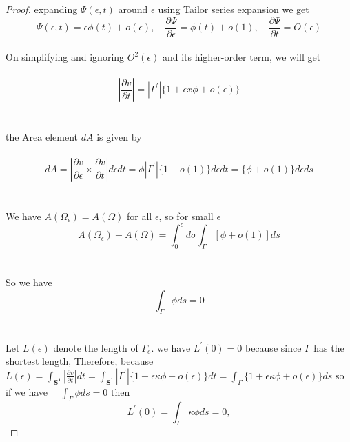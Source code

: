 \documentclass[oneside]{book}
\begin{document}
\begin{proof}
expanding $\Psi(\epsilon, t)$ around $\epsilon$ using Tailor series expansion we get \\

$$
\Psi(\epsilon, t)=\epsilon \phi(t)+o(\epsilon), \quad \frac{\partial \Psi}{\partial \epsilon}=\phi(t)+o(1), \quad \frac{\partial \Psi}{\partial t}=O(\epsilon)
$$ \\
On simplifying and ignoring $O^2(\epsilon)$ and its higher-order term, we will get \\\\
$$
\left|\frac{\partial v}{\partial t}\right|=\left|\Gamma^{\prime}\right|\{1+\epsilon x \phi+o(\epsilon)\}
$$ 
\\\\
 the Area element $d A$  is given by
 \\\\
     \begin{equation}
d A=\left|\frac{\partial v}{\partial \epsilon} \times \frac{\partial v}{\partial t}\right| d \epsilon d t=\phi\left|\Gamma^{\prime}\right|\{1+o(1)\} d \epsilon d t=\{\phi+o(1)\} d \epsilon d s
    \end{equation} \\\\
We have $A\left(\Omega_{\epsilon}\right)=A(\Omega)$ for all $\epsilon$, so for small $\epsilon$ \\

 $$
A\left(\Omega_{\epsilon}\right)-A(\Omega)=\int_{0}^{\epsilon} d \sigma \int_{\Gamma}[\phi+o(1)] d s
$$
\\\\
So we have \\
$$  
\int_{\Gamma} \phi d s=0
$$ \\\\
 Let $L(\epsilon)$ denote the length of $\Gamma_{e} .$  we have
$L^{\prime}(0)=0$ because since $\Gamma$ has the shortest length, Therefore, because
$L(\epsilon)=\int_{\mathbf{S^1}}\left|\frac{\partial v}{\partial t}\right| d t=\int_{\mathbf{S}^{1}}\left|\Gamma^{\prime}\right|\{1+\epsilon \kappa \phi+o(\epsilon)\} d t=\int_{\Gamma}\{1+\epsilon \kappa \phi+o(\epsilon)\} d s$
 so if we have
 $\quad \int_{\Gamma} \phi d s=0$ then 
$$
L^{\prime}(0)=\int_{\Gamma} \kappa \phi d s=0, 
$$

\end{proof} 
\end{document}

